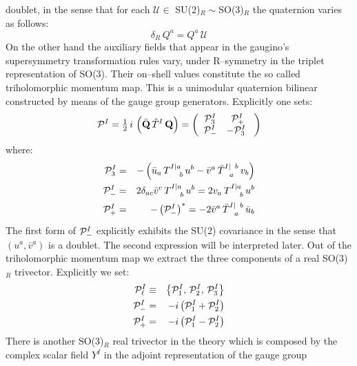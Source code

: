 \documentclass[a4paper,12pt]{article}
\newcommand{\ft}[2]{{\textstyle\frac{#1}{#2}}}
\begin{document}
doublet, in the sense that for each $\mathcal{U}\in$ SU(2)$_R \sim $SO(3)$_R$
the quaternion varies as follows:
\begin{equation}
  \delta_R \, Q^a = Q^a \, \mathcal{U}
\label{delquate}
\end{equation}
On the other hand the auxiliary fields that appear in the gaugino's
supersymmetry transformation rules vary, under R--symmetry in the
triplet representation of SO(3).
Their on--shell values constitute the so called triholomorphic momentum
map. This is a unimodular quaternion bilinear constructed by means of
the gauge group generators. Explicitly one sets:
\begin{equation}
  {\cal P}^I=\ft 1 2 \, i \, \left( {\bar {\bf Q}} \, {\hat T}^I \,{\bf Q}
  \right) = \left( \begin{array}{cc}
    {\cal P}^I_3 & {\cal P}^I_+ \\
    {\cal P}^I_-  & -{\cal P}^I_3 \
  \end{array}\right)
\label{triholo}
\end{equation}
where:
\begin{eqnarray}
{\cal P}^I_3  & = & -\left( {\bar u}_a \,
T^{I\vert a}_{\phantom {I\vert a}b}\, u^b- {\bar v}^a \,
{\bar T}^{I\vert\phantom{a} b}_{\phantom{I\vert}a}\,
v_b \right)  \nonumber\\
{\cal P}^I_-  & = &2\delta_{ac}{\bar v}^c\, T^{I\vert
a}_{\phantom{I\vert a}b} \, u^b =
2 {  v}_a \, T^{I\vert
a}_{\phantom{I\vert a}b} \, u^b  \nonumber\\
{\cal P}^I_+  & = & -\left({\cal P}^I_-\right)^* =
-2 {\bar  v}^a \, {\bar T}^{I\vert\phantom{a} b}_{\phantom{I\vert}a}
\, {\bar u}_b
\label{P3+-}
\end{eqnarray}
The first form of ${\cal P}^I_-$ explicitly exhibits the SU(2)
covariance in the sense that $(u^a,\bar{v}^a)$ is a doublet.
The second expression will be interpreted later.
Out of the triholomorphic momentum map we extract the three components
of a real SO(3)$_R$ trivector.
Explicitly we set:
\begin{eqnarray}
  {\cal P}^I_\ell &\equiv& \left\{
  {\cal P}^I_1,\,{\cal P}^I_2,\,
  {\cal P}^I_3 \right \} \nonumber\\
  {\cal P}^I_-&=&-i \left({\cal P}^I_1 +{\cal P}^I_2 \right)\nonumber\\
  {\cal P}^I_+&=&-i \left({\cal P}^I_1 -{\cal P}^I_2 \right)
\label{ppp}
\end{eqnarray}
There is another SO(3)$_R$  real trivector in the theory which is composed by
the complex scalar field $Y^I$ in the adjoint representation of the gauge group
\end{document}
